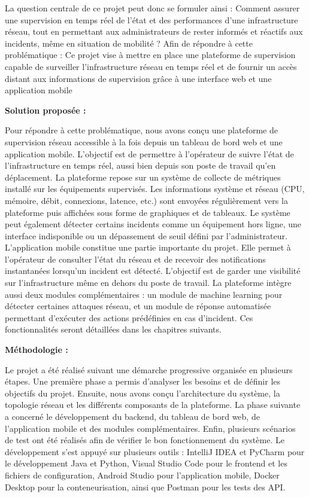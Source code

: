 \documentclass[12pt,a4paper]{report}
\begin{document}
La question centrale de ce projet peut donc se formuler ainsi : Comment assurer une supervision en temps réel de l’état et des performances d’une infrastructure réseau, tout en permettant aux administrateurs de rester informés et réactifs aux incidents, même en situation de mobilité ? Afin de répondre à cette problématique : Ce projet vise à mettre en place une plateforme de supervision capable de surveiller l’infrastructure réseau en temps réel et de fournir un accès distant aux informations de supervision grâce à une interface web et une application mobile\par
\textbf{Solution proposée :}\par
Pour répondre à cette problématique, nous avons conçu une plateforme de supervision réseau accessible à la fois depuis un tableau de bord web et une application mobile. L’objectif est de permettre à l’opérateur de suivre l’état de l’infrastructure en temps réel, aussi bien depuis son poste de travail qu’en déplacement. La plateforme repose sur un système de collecte de métriques installé sur les équipements supervisés. Les informations système et réseau (CPU, mémoire, débit, connexions, latence, etc.) sont envoyées régulièrement vers la plateforme puis affichées sous forme de graphiques et de tableaux. Le système peut également détecter certains incidents comme un équipement hors ligne, une interface indisponible ou un dépassement de seuil défini par l’administrateur. L’application mobile constitue une partie importante du projet. Elle permet à l’opérateur de consulter l’état du réseau et de recevoir des notifications instantanées lorsqu’un incident est détecté. L’objectif est de garder une visibilité sur l’infrastructure même en dehors du poste de travail. La plateforme intègre aussi deux modules complémentaires : un module de machine learning pour détecter certaines attaques réseau, et un module de réponse automatisée permettant d’exécuter des actions prédéfinies en cas d’incident. Ces fonctionnalités seront détaillées dans les chapitres suivants.\par
\textbf{Méthodologie :}\par
Le projet a été réalisé suivant une démarche progressive organisée en plusieurs étapes. Une première phase a permis d’analyser les besoins et de définir les objectifs du projet. Ensuite, nous avons conçu l’architecture du système, la topologie réseau et les différents composants de la plateforme. La phase suivante a concerné le développement du backend, du tableau de bord web, de l’application mobile et des modules complémentaires. Enfin, plusieurs scénarios de test ont été réalisés afin de vérifier le bon fonctionnement du système. Le développement s’est appuyé sur plusieurs outils : IntelliJ IDEA et PyCharm pour le développement Java et Python, Visual Studio Code pour le frontend et les fichiers de configuration, Android Studio pour l’application mobile, Docker Desktop pour la conteneurisation, ainsi que Postman pour les tests des API.\par
\end{document}
